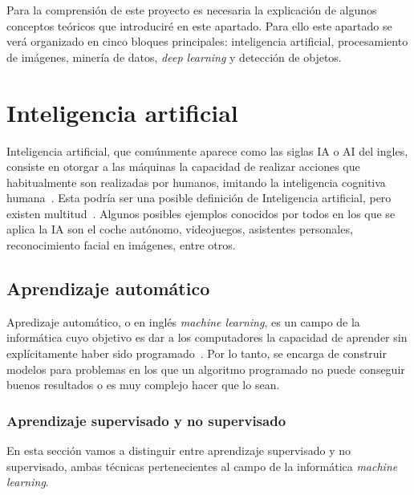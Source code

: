 

Para la comprensión de este proyecto es necesaria la explicación de algunos conceptos teóricos que introduciré en este apartado. Para ello este apartado se verá organizado en cinco bloques principales: inteligencia artificial, procesamiento de imágenes, minería de datos, \textit{deep learning} y detección de objetos.

\section{Inteligencia artificial}

Inteligencia artificial, que comúnmente aparece como las siglas IA o AI del ingles, consiste en otorgar a las máquinas la capacidad de realizar acciones que habitualmente son realizadas por humanos, imitando la inteligencia cognitiva humana~\cite{alanturing:ai}. Esta podría ser una posible definición de Inteligencia artificial, pero existen multitud~\cite{russell1995modern}. Algunos posibles ejemplos conocidos por todos en los que se aplica la IA son el coche autónomo, videojuegos, asistentes personales, reconocimiento facial en imágenes, entre otros.

\subsection{Aprendizaje automático}

Apredizaje automático, o en inglés \textit{machine learning}, es un campo de la informática cuyo objetivo es dar a los computadores la capacidad de aprender sin explícitamente haber sido programado~\cite{wiki:machinelearning}. Por lo tanto, se encarga de construir modelos para problemas en los que un algoritmo programado no puede conseguir buenos resultados o es muy complejo hacer que lo sean.



\subsubsection{Aprendizaje supervisado y no supervisado}

En esta sección vamos a distinguir entre aprendizaje supervisado y no supervisado, ambas técnicas pertenecientes al campo de la informática \textit{machine learning}.


